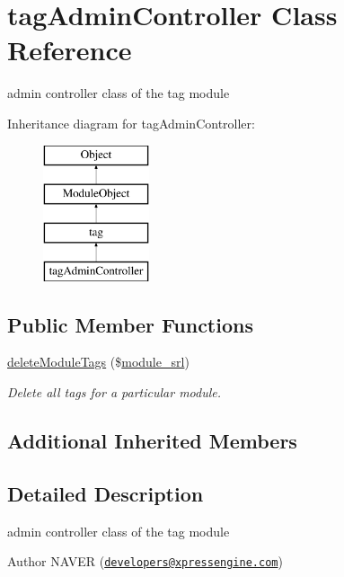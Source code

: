 \hypertarget{classtagAdminController}{\section{tag\+Admin\+Controller Class Reference}
\label{classtagAdminController}
}


admin controller class of the tag module  


Inheritance diagram for tag\+Admin\+Controller\+:\begin{figure}[H]
\begin{center}
\leavevmode
\includegraphics[height=4.000000cm]{classtagAdminController}
\end{center}
\end{figure}
\subsection*{Public Member Functions}
\begin{DoxyCompactItemize}
\item 
\hyperlink{classtagAdminController_a26a0cf3fda1e1d57de9810e76dd72765}{delete\+Module\+Tags} (\$\hyperlink{ko_8install_8php_a370bb6450fab1da3e0ed9f484a38b761}{module\+\_\+srl})
\begin{DoxyCompactList}\small\item\em Delete all tags for a particular module. \end{DoxyCompactList}\end{DoxyCompactItemize}
\subsection*{Additional Inherited Members}


\subsection{Detailed Description}
admin controller class of the tag module 

\begin{DoxyAuthor}{Author}
N\+A\+V\+E\+R (\href{mailto:developers@xpressengine.com}{\tt developers@xpressengine.\+com}) 
\end{DoxyAuthor}


